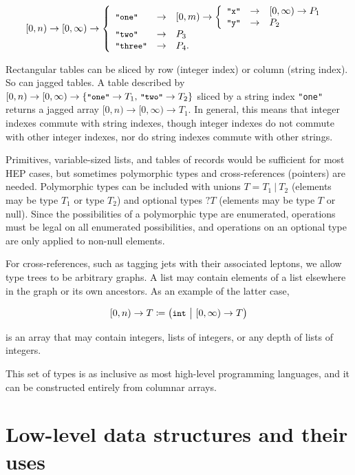 \documentclass{webofc}
\begin{document}
\vspace{-\baselineskip}
\[ [0, n) \to [0, \infty) \to \left\{\begin{array}{l c l}
\mbox{\small\tt "one"} & \to & [0, m) \to \left \{\begin{array}{l c l} \mbox{\small\tt "x"} & \to & [0, \infty) \to P_1 \\ \mbox{\small\tt "y"} & \to & P_2 \end{array}\right. \\
\mbox{\small\tt "two"} & \to & P_3 \\
\mbox{\small\tt "three"} & \to & P_4\mbox{.} \end{array}\right. \]

Rectangular tables can be sliced by row (integer index) or column (string index). So can jagged tables. A table described by $[0, n) \to [0, \infty) \to \{\mbox{\small\tt "one"} \to T_1\mbox{, }\mbox{\small\tt "two"} \to T_2\}$ sliced by a string index {\small\tt "one"} returns a jagged array $[0, n) \to [0, \infty) \to T_1$. In general, this means that integer indexes commute with string indexes, though integer indexes do not commute with other integer indexes, nor do string indexes commute with other strings.

Primitives, variable-sized lists, and tables of records would be sufficient for most HEP cases, but sometimes polymorphic types and cross-references (pointers) are needed. Polymorphic types can be included with unions $T = T_1\ |\ T_2$ (elements may be type $T_1$ or type $T_2$) and optional types $?T$ (elements may be type $T$ or null). Since the possibilities of a polymorphic type are enumerated, operations must be legal on all enumerated possibilities, and operations on an optional type are only applied to non-null elements.

For cross-references, such as tagging jets with their associated leptons, we allow type trees to be arbitrary graphs. A list may contain elements of a list elsewhere in the graph or its own ancestors. As an example of the latter case,

\[ [0, n) \to T \coloneqq \big( \mbox{\small\tt int}\ \big|\ [0, \infty) \to T \big) \]

\noindent is an array that may contain integers, lists of integers, or any depth of lists of integers.

This set of types is as inclusive as most high-level programming languages, and it can be constructed entirely from columnar arrays.

\section{Low-level data structures and their uses}
\end{document}
